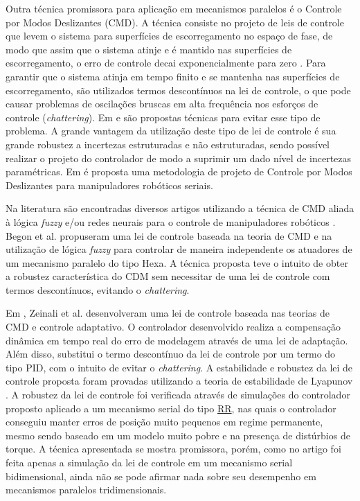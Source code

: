 \documentclass[]{politex}
\begin{document}
Outra técnica promissora para aplicação em mecanismos paralelos é o Controle por Modos Deslizantes (CMD). A técnica consiste no projeto de leis de controle que levem o sistema para superfícies de escorregamento no espaço de fase, de modo que assim que o sistema atinje e é mantido nas superfícies de escorregamento, o erro de controle decai exponencialmente para zero \cite{Slotini}. Para garantir que o sistema atinja em tempo finito e se mantenha nas superfícies de escorregamento, são utilizados termos descontínuos na lei de controle, o que pode causar problemas de oscilações bruscas em alta frequência nos esforços de controle ({\em chattering}). Em \cite{Guldner}  e  \cite{Utkin2} são propostas técnicas para evitar esse tipo de problema. A grande vantagem da utilização deste tipo de lei de controle é sua grande robustez a incertezas estruturadas e não estruturadas, sendo possível realizar o projeto do controlador de modo a suprimir um dado nível de incertezas paramétricas. Em \cite{SlotiniSMC} é proposta uma metodologia de projeto de Controle por Modos Deslizantes para manipuladores robóticos seriais.

Na literatura são encontradas diversos artigos utilizando a técnica de CMD aliada à lógica {\em fuzzy} e/ou redes neurais para o controle de manipuladores robóticos \cite{Begon, Ertugrul, Hu, Sadati}. Begon et al. \cite{Begon} propuseram uma lei de controle baseada na teoria de CMD e na utilização de lógica {\em fuzzy} para controlar de maneira independente os atuadores de um mecanismo paralelo do tipo Hexa. A técnica proposta teve o intuito de obter a robustez característica do CDM sem necessitar de uma lei de controle com termos descontínuos, evitando o {\em chattering}.

Em \cite{Zeinali}, Zeinali et al. desenvolveram uma lei de controle  baseada nas teorias de CMD e controle adaptativo. O controlador desenvolvido realiza a compensação dinâmica em tempo real do erro de modelagem através de uma lei de adaptação. Além disso, substitui o termo descontínuo da lei de controle por um termo do tipo PID, com o intuito de evitar o {\em chattering}. A estabilidade e robustez da lei de controle proposta foram provadas utilizando a teoria de estabilidade de Lyapunov \cite{Slotini}. A robustez da lei de controle foi verificada através de simulações do controlador proposto aplicado a um mecanismo serial do tipo \underline{R}\underline{R}, nas quais o controlador conseguiu manter erros de posição muito pequenos em regime permanente, mesmo sendo baseado em um modelo muito pobre e na presença de distúrbios de torque. A técnica apresentada se mostra promissora, porém, como no artigo foi feita apenas a simulação da lei de controle em um mecanismo serial bidimensional, ainda não se pode afirmar nada sobre seu desempenho em mecanismos paralelos tridimensionais.
\end{document}
